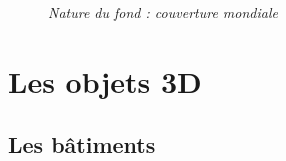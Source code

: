\begin{center}
\begin{figure}[ht]
\caption{\label{sedimento2}\textit{Nature du fond : couverture mondiale}}
\end{figure}
\end{center}
\chapter{Les objets 3D}
\section{Les bâtiments}
